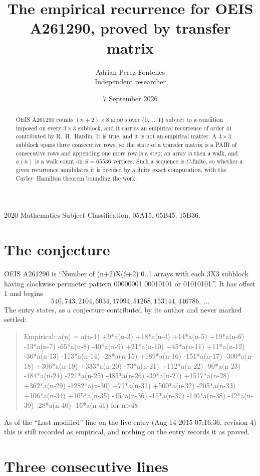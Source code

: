 \documentclass[11pt,a4paper]{article}
\title{The empirical recurrence for OEIS A261290, proved by transfer matrix}
\author{Adrian Perez Fontelles\\ \small Independent researcher}
\date{7 September 2026}
\theoremstyle{plain}
\theoremstyle{definition}
\begin{document}
\maketitle

\begin{abstract}
OEIS A261290 counts $(n+2)\times8$ arrays over $\{0,\dots,1\}$ subject to a condition imposed on
every $3\times3$ subblock, and it carries an empirical recurrence of order $41$
contributed by R.~H.~Hardin. It is true, and it is not an empirical matter. A $3\times3$
subblock spans three consecutive rows, so the state of a transfer matrix is a PAIR of
consecutive rows and appending one more row is a step; an array is then a walk, and
$a(n)$ is a walk count on $S=65536$ vertices. Such a sequence is $C$-finite, so whether a given
recurrence annihilates it is decided by a finite exact computation, with the Cayley--Hamilton
theorem bounding the work.
\end{abstract}

\noindent\small 2020 Mathematics Subject Classification. 05A15, 05B45, 15B36.\normalsize

\section{The conjecture}

OEIS A261290 is ``Number of (n+2)X(6+2) 0..1 arrays with each 3X3 subblock having clockwise perimeter pattern 00000001 00010101 or 01010101.''. It has offset $1$ and begins
\[
540, 743, 2104, 6034, 17094, 51268, 153144, 446786,\ \dots
\]
The entry states, as a conjecture contributed by its author and never marked settled:
\begin{quote}
Empirical: a(n) = a(n-1) +9*a(n-3) +18*a(n-4) +14*a(n-5) +19*a(n-6) -13*a(n-7) -65*a(n-8) -40*a(n-9) +21*a(n-10) +45*a(n-11) +11*a(n-12) -36*a(n-13) -113*a(n-14) -28*a(n-15) +189*a(n-16) -151*a(n-17) -300*a(n-18) +306*a(n-19) +333*a(n-20) -73*a(n-21) +112*a(n-22) -90*a(n-23) -484*a(n-24) -221*a(n-25) -485*a(n-26) -39*a(n-27) +1517*a(n-28) +362*a(n-29) -1282*a(n-30) +71*a(n-31) +500*a(n-32) -205*a(n-33) +106*a(n-34) +105*a(n-35) -45*a(n-36) -15*a(n-37) -140*a(n-38) -42*a(n-39) -28*a(n-40) -16*a(n-41) for n>48
\end{quote}
As of the ``Last modified'' line on the live entry (Aug 14 2015 07:16:36, revision 4) this is still
recorded as empirical, and nothing on the entry records it as proved.

\section{Three consecutive lines}
\end{document}
